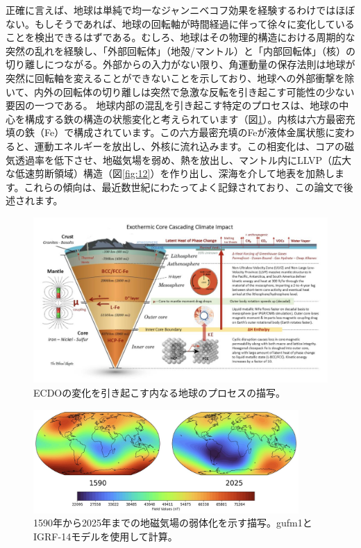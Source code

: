 \documentclass[10pt,twocolumn,letterpaper]{article}
\begin{document}
正確に言えば、地球は単純で均一なジャンニベコフ効果を経験するわけではほぼない。もしそうであれば、地球の回転軸が時間経過に伴って徐々に変化していることを検出できるはずである。むしろ、地球はその物理的構造における周期的な突然の乱れを経験し、「外部回転体」（地殻/マントル）と「内部回転体」（核）の切り離しにつながる。外部からの入力がない限り、角運動量の保存法則は地球が突然に回転軸を変えることができないことを示しており、地球への外部衝撃を除いて、内外の回転体の切り離しは突然で急激な反転を引き起こす可能性の少ない要因の一つである。
地球内部の混乱を引き起こす特定のプロセスは、地球の中心を構成する鉄の構造の状態変化と考えられています（図\ref{fig:11}）。内核は六方最密充填の鉄（Fe）で構成されています\cite{141}。この六方最密充填のFeが液体金属状態に変わると、運動エネルギーを放出し、外核に流れ込みます。この相変化は、コアの磁気透過率を低下させ、地磁気場を弱め、熱を放出し、マントル内にLLVP（広大な低速剪断領域）構造\cite{38}（図\ref{fig:12}）を作り出し、深海を介して地表を加熱します。これらの傾向は、最近数世紀にわたってよく記録されており、この論文で後述されます。

\begin{figure}[t]
\begin{center}
\includegraphics[width=1\textwidth]{layers.jpg}
\end{center}
   \caption{ECDOの変化を引き起こす内なる地球のプロセスの描写\cite{129}。}
\label{fig:11}
\end{figure}

\begin{figure}[b]
\begin{center}
\includegraphics[width=0.9\textwidth]{saa.jpg}
\end{center}
   \caption{1590年から2025年までの地磁気場の弱体化を示す描写。gufm1とIGRF-14モデルを使用して計算\cite{125,126}。}
\label{fig:14}
\end{figure}
\end{document}
